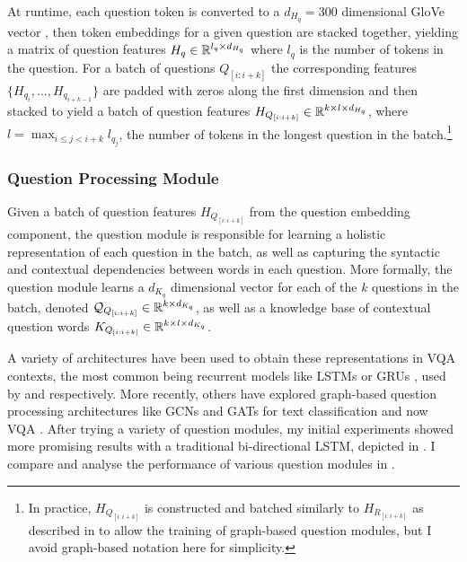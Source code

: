 At runtime, each question token is converted to a \(d_{H_q} = 300\) dimensional GloVe vector \cite{pennington2014glove}, then token embeddings for a given question are stacked together, yielding a matrix of question features \(H_q \in \mathbb{R}^{l_q \times d_{H_q}}\) where \(l_q\) is the number of tokens in the question. For a batch of questions \(Q_{[i:i+k]}\) the corresponding features \(\{H_{q_i}, ..., H_{q_{i+k-1}}\}\) are padded with zeros along the first dimension and then stacked to yield a batch of question features \(H_{Q_{[i:i+k]}} \in \mathbb{R}^{k \times l \times d_{H_q}}\), where \(l = \max_{i \leq j < i+k} l_{q_j}\), the number of tokens in the longest question in the batch.\footnote{In practice, \(H_{Q_{[i:i+k]}}\) is constructed and batched similarly to \(H_{R_{[i:i+k]}}\) as described in \subsectionautorefname{ \ref{sec:scene_graph_embedding_details}} to allow the training of graph-based question modules, but I avoid graph-based notation here for simplicity.}

\subsubsection{Question Processing Module}

Given a batch of question features \(H_{Q_{[i:i+k]}}\) from the question embedding component, the question module is responsible for learning a holistic representation of each question in the batch, as well as capturing the syntactic and contextual dependencies between words in each question. More formally, the question module learns a \(d_{K_q}\) dimensional vector for each of the \(k\) questions in the batch, denoted \(\mathcal{Q}_{Q_{[i:i+k]}} \in \mathbb{R}^{k \times d_{K_q}}\), as well as a knowledge base of contextual question words \(K_{Q_{[i:i+k]}} \in \mathbb{R}^{k \times l \times d_{K_q}}\).

A variety of architectures have been used to obtain these representations in VQA contexts, the most common being recurrent models like LSTMs \cite{hochreiter1997long} or GRUs \cite{cho2014learning}, used by \cite{perez2017film, hudson2018compositional, lu2016hierarchical, yu2019deep} and \cite{anderson2018bottom, teney2018tips, li2019relation, liu2019densely, gao2019dynamic, kim2018bilinear} respectively. More recently, others have explored graph-based question processing architectures like GCNs and GATs for text classification \cite{yao2019graph, liu2020tensor} and now VQA \cite{huang2020aligned}. After trying a variety of question modules, my initial experiments showed more promising results with a traditional bi-directional LSTM, depicted in \figureautorefname{ \ref{fig:question_module_bilstm}}. I compare and analyse the performance of various question modules in \subsectionautorefname{ \ref{subsec:question_module_ablations}}.

